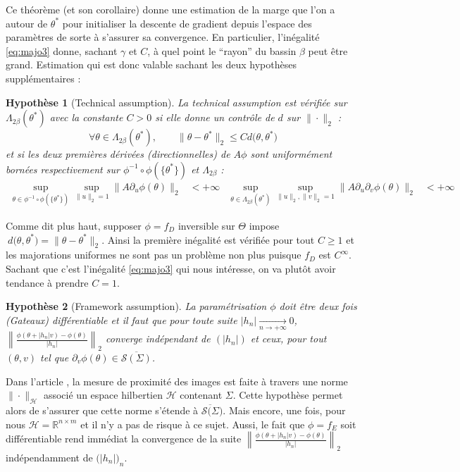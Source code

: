 \documentclass[hidelinks, french]{article} %
\newcommand{\R}{\mathbb{R}}
\newcommand{\lr}{\longrightarrow}
\renewcommand{\leq}{\leqslant}
\renewcommand{\geq}{\geqslant}
\theoremstyle{enonce}
\newtheorem{assump}{Hypothèse}
\theoremstyle{special}
\theoremstyle{rq}
\theoremstyle{exo}
\theoremstyle{demo}
\begin{document}
Ce théorème (et son corollaire) donne une estimation de la marge que l'on a autour de $\theta^*$ pour initialiser la descente de gradient depuis l'espace des paramètres de sorte à s'assurer sa convergence. En particulier, l'inégalité \ref{eq:majo3} donne, sachant $\gamma$ et $C$, à quel point le ``rayon'' du bassin $\beta$ peut être grand.
Estimation qui est donc valable sachant les deux hypothèses supplémentaires :
\\
\begin{assump}[Technical assumption]\label{hyp:technical}
	La \emph{technical assumption} est vérifiée sur $\Lambda_{2\beta}(\theta^*)$ avec la constante $C>0$ si elle donne un contrôle de $d$ sur $\|\cdot\|_2$ :
	\[\forall\theta\in\Lambda_{2\beta}(\theta^*),\qquad \big\|\theta-\theta^*\big\|_2\leq C d\big(\theta, \theta^*\big)\]
	et si les deux premières dérivées (directionnelles) de $A\phi$ sont uniformément bornées respectivement sur $\phi^{-1}\circ\phi(\{\theta^*\})$ et $\Lambda_{2\beta}$ :
	\begin{align*}\sup_{\theta\in\phi^{-1}\circ\phi(\{\theta^*\})}\sup_{\|u\|_2=1}\big\|A\partial_u\phi(\theta)\big\|_2&<+\infty  &  \sup_{\theta\in\Lambda_{2\beta}(\theta^*)}\sup_{\|u\|_2,\|v\|_2=1}\big\|A\partial_u\partial_v\phi(\theta)\big\|_2&<+\infty
	\end{align*}
\end{assump}

Comme dit plus haut, supposer $\phi=f_D$ inversible sur $\Theta$ impose $\ d\big(\theta, \theta^*\big)=\big\|\theta-\theta^*\big\|_2$. Ainsi la première inégalité est vérifiée pour tout $C\geq1$ et les majorations uniformes ne sont pas un problème non plus puisque $f_D$ est $C^\infty$. Sachant que c'est l'inégalité \ref{eq:majo3} qui nous intéresse, on va plutôt avoir tendance à prendre $C=1$.
\\

\begin{assump}[Framework assumption]\label{hyp:framework}
	La paramétrisation $\phi$ doit être deux fois (Gateaux) différentiable et il faut que pour toute suite $|h_n|\xrightarrow[n\lr+\infty]{} 0$, $\left\|\frac{\phi(\theta +|h_n|v)-\phi(\theta)}{|h_n|}\right\|_2$ converge indépendant de $(|h_n|)$ et ceux, pour tout $(\theta,v)$ tel que $\partial_v\phi(\theta)\in\overline{\mathcal{S}(\Sigma)}$.
\end{assump}

Dans l'article \cite{traonmilin_basins_2022}, la mesure de proximité des images est faite à travers une norme $\|\cdot\|_\mathcal{H}$ associé un espace hilbertien $\mathcal{H}$ contenant $\Sigma$. Cette hypothèse permet alors de s'assurer que cette norme s'étende à $\overline{\mathcal{S}(\Sigma})$. Mais encore, une fois, pour nous $\mathcal{H}=\R^{n\times m}$ et il n'y a pas de risque à ce sujet. Aussi, le fait que $\phi=f_E$ soit différentiable rend immédiat la convergence de la suite $\left\|\frac{\phi(\theta +|h_n|v)-\phi(\theta)}{|h_n|}\right\|_2$ indépendamment de $\big(|h_n|\big)_n$.
\\ \\
\end{document}
